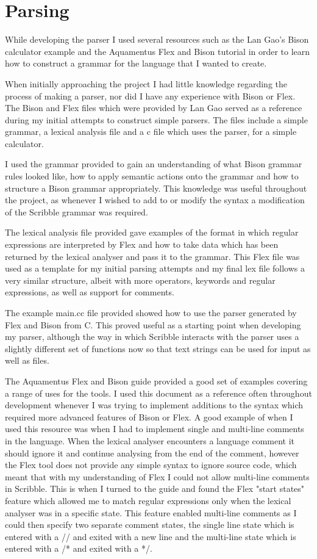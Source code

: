 \documentclass[]{final_report}
\begin{document}
\section{Parsing}

While developing the parser I used several resources such as the Lan Gao's Bison calculator\cite{BISONTUT} example and the Aquamentus Flex and Bison tutorial\cite{AQBISON} in order to learn how to construct a grammar for the language that I wanted to create.

When initially approaching the project I had little knowledge regarding the process of making a parser, nor did I have any experience with Bison or Flex. The Bison and Flex files which were provided by Lan Gao served as a reference during my initial attempts to construct simple parsers. The files include a simple grammar, a lexical analysis file and a c file which uses the parser, for a simple calculator.

I used the grammar provided to gain an understanding of what Bison grammar rules looked like, how to apply semantic actions onto the grammar and how to structure a Bison grammar appropriately. This knowledge was useful throughout the project, as whenever I wished to add to or modify the syntax a modification of the Scribble grammar was required.

The lexical analysis file provided gave examples of the format in which regular expressions are interpreted by Flex and how to take data which has been returned by the lexical analyser and pass it to the grammar. This Flex file was used as a template for my initial parsing attempts and my final lex file follows a very similar structure, albeit with more operators, keywords and regular expressions, as well as support for comments.

The example main.cc file provided showed how to use the parser generated by Flex and Bison from C. This proved useful as a starting point when developing my parser, although the way in which Scribble interacts with the parser uses a slightly different set of functions now so that text strings can be used for input as well as files.

The Aquamentus Flex and Bison guide\cite{AQBISON} provided a good set of examples covering a range of uses for the tools. I used this document as a reference often throughout development whenever I was trying to implement additions to the syntax which required more advanced features of Bison or Flex. A good example of when I used this resource was when I had to implement single and multi-line comments in the language. When the lexical analyser encounters a language comment it should ignore it and continue analysing from the end of the comment, however the Flex tool does not provide any simple syntax to ignore source code, which meant that with my understanding of Flex I could not allow multi-line comments in Scribble. This is when I turned to the guide and found the Flex "start states" feature which allowed me to match regular expressions only when the lexical analyser was in a specific state. This feature enabled multi-line comments as I could then specify two separate comment states, the single line state which is entered with a // and exited with a new line and the multi-line state which is entered with a /* and exited with a */.
\end{document}
